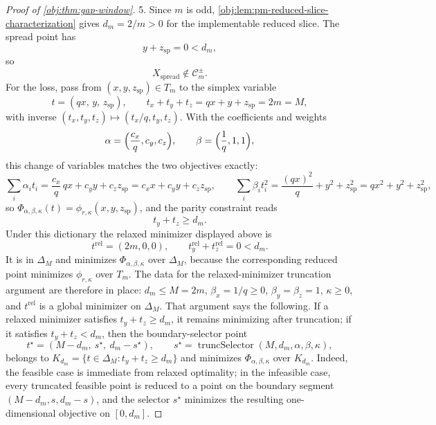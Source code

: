 \documentclass[11pt]{article}
\begin{document}
\begin{proof}[Proof of \cref{obj:thm:gap-window}]
5.  Since \(m\) is odd, \cref{obj:lem:pm-reduced-slice-characterization} gives \(d_m=2/m>0\) for the implementable reduced slice. The spread point has
\[
y+z_{\mathrm{sp}}=0<d_m,
\]
so
\[
X_{\mathrm{spread}}\notin\mathcal C_m^{\pm}.
\]
For the loss, pass from \((x,y,z_{\mathrm{sp}})\in T_m\) to the simplex variable
\[
t=(qx,\,y,\,z_{\mathrm{sp}}),
\qquad
t_x+t_y+t_z=qx+y+z_{\mathrm{sp}}=2m=M,
\]
with inverse \((t_x,t_y,t_z)\mapsto(t_x/q,t_y,t_z)\).  With the coefficients and weights
\[
\alpha=\Bigl(\frac{c_x}{q},c_y,c_z\Bigr),
\qquad
\beta=\Bigl(\frac1q,1,1\Bigr),
\]
this change of variables matches the two objectives exactly:
\[
\sum_i\alpha_it_i=\frac{c_x}{q}\,qx+c_yy+c_zz_{\mathrm{sp}}
=c_xx+c_yy+c_zz_{\mathrm{sp}},
\qquad
\sum_i\beta_it_i^2=\frac{(qx)^2}{q}+y^2+z_{\mathrm{sp}}^2=qx^2+y^2+z_{\mathrm{sp}}^2,
\]
so \(\Phi_{\alpha,\beta,\kappa}(t)=\phi_{r,\kappa}(x,y,z_{\mathrm{sp}})\), and the parity constraint reads
\[
t_y+t_z\ge d_m.
\]
Under this dictionary the relaxed minimizer displayed above is
\[
t^{\mathrm{rel}}=(2m,0,0),
\qquad
t^{\mathrm{rel}}_y+t^{\mathrm{rel}}_z=0<d_m .
\]
It is in \(\Delta_M\) and minimizes \(\Phi_{\alpha,\beta,\kappa}\) over \(\Delta_M\), because the corresponding reduced point minimizes \(\phi_{r,\kappa}\) over \(T_m\). The data for the relaxed-minimizer truncation argument are therefore in place: \(d_m\le M=2m\), \(\beta_x=1/q\ge0\), \(\beta_y=\beta_z=1\), \(\kappa\ge0\), and \(t^{\mathrm{rel}}\) is a global minimizer on \(\Delta_M\). That argument says the following. If a relaxed minimizer satisfies \(t_y+t_z\ge d_m\), it remains minimizing after truncation; if it satisfies \(t_y+t_z<d_m\), then the boundary-selector point
\[
t^\star
=
\left(M-d_m,\ s^\star,\ d_m-s^\star\right),
\qquad
s^\star=
\operatorname{truncSelector}(M,d_m,\alpha,\beta,\kappa),
\]
belongs to \(K_{d_m}=\{t\in\Delta_M:t_y+t_z\ge d_m\}\) and minimizes \(\Phi_{\alpha,\beta,\kappa}\) over \(K_{d_m}\). Indeed, the feasible case is immediate from relaxed optimality; in the infeasible case, every truncated feasible point is reduced to a point on the boundary segment \((M-d_m,s,d_m-s)\), and the selector \(s^\star\) minimizes the resulting one-dimensional objective on \([0,d_m]\).


\end{proof}
\end{document}
